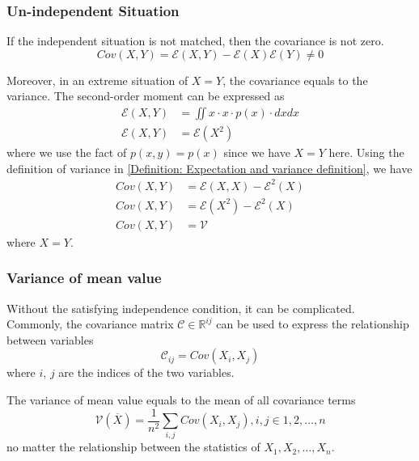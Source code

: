 \documentclass[../main.tex]{subfiles}
\begin{document}
\subsubsection{Un-independent Situation}

If the independent situation is not matched, then the covariance is not zero.
\begin{equation*}
    Cov(X, Y) =
    \mathcal{E}(X, Y) - \mathcal{E}(X)\mathcal{E}(Y)
    \neq 0
\end{equation*}

Moreover, in an extreme situation of $X=Y$, the covariance equals to the variance.
The second-order moment can be expressed as
\begin{align*}
    \mathcal{E}(X, Y) & = \iint x \cdot x \cdot p(x) \cdot dx dx \\
    \mathcal{E}(X, Y) & = \mathcal{E}(X^2)
\end{align*}
where we use the fact of $p(x, y) = p(x)$ since we have $X=Y$ here.
Using the definition of variance in \eqref{Definition: Expectation and variance definition}, we have
\begin{align*}
    Cov(X, Y) & = \mathcal{E}(X, X) - \mathcal{E}^2(X) \\
    Cov(X, Y) & = \mathcal{E}(X^2) - \mathcal{E}^2(X)  \\
    Cov(X, Y) & = \mathcal{V}
\end{align*}
where $X=Y$.

\subsubsection{Variance of mean value}

Without the satisfying independence condition, it can be complicated.
Commonly, the covariance matrix $\mathcal{C} \in \mathbb{R}^{ij}$ can be used to express the relationship between variables
\begin{equation*}
    \mathcal{C}_{ij} = Cov(X_i, X_j)
\end{equation*}
where $i$, $j$ are the indices of the two variables.
\begin{lemma}
    \label{Lemma: Variance of mean value}
    The variance of mean value equals to the mean of all covariance terms
    \begin{equation*}
        \mathcal{V}(\overline{X}) =
        \frac{1}{n^2} \sum_{i, j} Cov(X_i, X_j),
        i, j \in 1, 2, \dots, n
    \end{equation*}
    no matter the relationship between the statistics of $X_1, X_2, \dots, X_n$.
\end{lemma}
\end{document}
